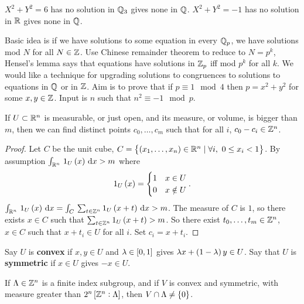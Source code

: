 \begin{example*}
$ X^2 + Y^2 = 6 $ has no solution in $ \mathbb{Q}_3 $ gives none in $ \mathbb{Q} $. $ X^2 + Y^2 = -1 $ has no solution in $ \mathbb{R} $ gives none in $ \mathbb{Q} $.
\end{example*}

Basic idea is if we have solutions to some equation in every $ \mathbb{Q}_p $, we have solutions mod $ N $ for all $ N \in \mathbb{Z} $. Use Chinese remainder theorem to reduce to $ N = p^k $, Hensel's lemma says that equations have solutions in $ \mathbb{Z}_p $ iff mod $ p^k $ for all $ k $. We would like a technique for upgrading solutions to congruences to solutions to equations in $ \mathbb{Q} $ or in $ \mathbb{Z} $. Aim is to prove that if $ p \equiv 1 \mod 4 $ then $ p = x^2 + y^2 $ for some $ x, y \in \mathbb{Z} $. Input is $ n $ such that $ n^2 \equiv -1 \mod p $.

\begin{lemma}
\label{lem:4.1}
If $ U \subset \mathbb{R}^n $ is measurable, or just open, and its measure, or volume, is bigger than $ m $, then we can find distinct points $ c_0, \dots, c_m $ such that for all $ i $, $ c_0 - c_i \in \mathbb{Z}^n $.
\end{lemma}

\begin{proof}
Let $ C $ be the unit cube, $ C = \cbr{\br{x_1, \dots, x_n} \in \R^n \mid \forall i, \ 0 \le x_i < 1} $. By assumption $ \intd{\R^n}{}{1_U\br{x}}{x} > m $ where
$$ 1_U\br{x} =
\begin{cases}
1 & x \in U \\
0 & x \notin U
\end{cases}.
$$
$ \intd{\R^n}{}{1_U\br{x}}{x} = \intd{C}{}{\sum_{t \in \Z^n} 1_U\br{x + t}}{x} > m $. The measure of $ C $ is $ 1 $, so there exists $ x \in C $ such that $ \sum_{t \in \Z^n} 1_U\br{x + t} > m $. So there exist $ t_0, \dots, t_m \in \mathbb{Z}^n $, $ x \in C $ such that $ x + t_i \in U $ for all $ i $. Set $ c_i = x + t_i $.
\end{proof}

\begin{definition}
Say $ U $ is \textbf{convex} if $ x, y \in U $ and $ \lambda \in \sbr{0, 1} $ gives $ \lambda x + \br{1 - \lambda}y \in U $. Say that $ U $ is \textbf{symmetric} if $ x \in U $ gives $ -x \in U $.
\end{definition}

\begin{corollary}[Minkowski]
\label{cor:4.3}
If $ \Lambda \in \mathbb{Z}^n $ is a finite index subgroup, and if $ V $ is convex and symmetric, with measure greater than $ 2^n\sbr{\Z^n : \Lambda} $, then $ V \cap \Lambda \ne \cbr{0} $.
\end{corollary}

